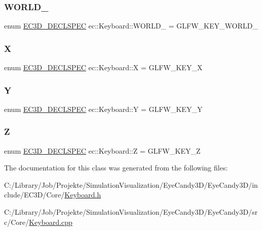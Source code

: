 \subsubsection{\texorpdfstring{W\+O\+R\+L\+D\+\_}{WORLD\_2}}
{\footnotesize\ttfamily enum \mbox{\hyperlink{_common_8h_aac42573e202ca3dd4d259c81691e2369}{E\+C3\+D\+\_\+\+D\+E\+C\+L\+S\+P\+EC}} ec\+::\+Keyboard\+::\+W\+O\+R\+L\+D\+\_ = G\+L\+F\+W\+\_\+\+K\+E\+Y\+\_\+\+W\+O\+R\+L\+D\+\_}

\mbox{\label{classec_1_1_keyboard_a46a9272c629195e29395f7e8d22e7cf5}} 
\subsubsection{\texorpdfstring{X}{X}}
{\footnotesize\ttfamily enum \mbox{\hyperlink{_common_8h_aac42573e202ca3dd4d259c81691e2369}{E\+C3\+D\+\_\+\+D\+E\+C\+L\+S\+P\+EC}} ec\+::\+Keyboard\+::X = G\+L\+F\+W\+\_\+\+K\+E\+Y\+\_\+X}

\mbox{\label{classec_1_1_keyboard_a3e6065997f9693286591e1300769e13a}} 
\subsubsection{\texorpdfstring{Y}{Y}}
{\footnotesize\ttfamily enum \mbox{\hyperlink{_common_8h_aac42573e202ca3dd4d259c81691e2369}{E\+C3\+D\+\_\+\+D\+E\+C\+L\+S\+P\+EC}} ec\+::\+Keyboard\+::Y = G\+L\+F\+W\+\_\+\+K\+E\+Y\+\_\+Y}

\mbox{\label{classec_1_1_keyboard_a342c1ef739e9fd209135017e48f25c58}} 
\subsubsection{\texorpdfstring{Z}{Z}}
{\footnotesize\ttfamily enum \mbox{\hyperlink{_common_8h_aac42573e202ca3dd4d259c81691e2369}{E\+C3\+D\+\_\+\+D\+E\+C\+L\+S\+P\+EC}} ec\+::\+Keyboard\+::Z = G\+L\+F\+W\+\_\+\+K\+E\+Y\+\_\+Z}



The documentation for this class was generated from the following files\+:\begin{DoxyCompactItemize}
\item 
C\+:/\+Library/\+Job/\+Projekte/\+Simulation\+Visualization/\+Eye\+Candy3\+D/\+Eye\+Candy3\+D/include/\+E\+C3\+D/\+Core/\mbox{\hyperlink{_keyboard_8h}{Keyboard.\+h}}\item 
C\+:/\+Library/\+Job/\+Projekte/\+Simulation\+Visualization/\+Eye\+Candy3\+D/\+Eye\+Candy3\+D/src/\+Core/\mbox{\hyperlink{_keyboard_8cpp}{Keyboard.\+cpp}}\end{DoxyCompactItemize}
